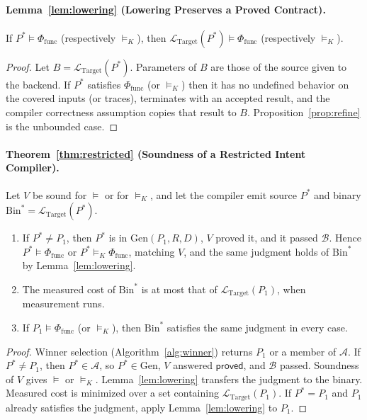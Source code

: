 \paragraph{Lemma~\ref{lem:lowering} (Lowering Preserves a Proved Contract).}
If \(P^* \models \Phi_{\text{func}}\) (respectively \(\models_K\)), then
\(\mathcal{L}_{\text{Target}}(P^*) \models \Phi_{\text{func}}\)
(respectively \(\models_K\)).
\begin{proof}
Let \(B = \mathcal{L}_{\text{Target}}(P^*)\). Parameters of \(B\) are those
of the source given to the backend. If \(P^*\) satisfies \(\Phi_{\text{func}}\)
(or \(\models_K\)) then it has no undefined behavior on the covered inputs
(or traces), terminates with an accepted result, and the compiler
correctness assumption copies that result to \(B\).
Proposition~\ref{prop:refine} is the unbounded case.
\end{proof}

\paragraph{Theorem~\ref{thm:restricted} (Soundness of a Restricted Intent Compiler).}
Let \(V\) be sound for \(\models\) or for \(\models_K\), and let the compiler
emit source \(P^*\) and binary
\(\mathrm{Bin}^* = \mathcal{L}_{\text{Target}}(P^*)\).
\begin{enumerate}
  \item If \(P^* \neq P_1\), then \(P^*\) is in \(\mathrm{Gen}(P_1, R, D)\),
  \(V\) proved it, and it passed \(\mathcal{B}\). Hence
  \(P^* \models \Phi_{\text{func}}\) or \(P^* \models_K \Phi_{\text{func}}\),
  matching \(V\), and the same judgment holds of \(\mathrm{Bin}^*\) by
  Lemma~\ref{lem:lowering}.
  \item The measured cost of \(\mathrm{Bin}^*\) is at most that of
  \(\mathcal{L}_{\text{Target}}(P_1)\), when measurement runs.
  \item If \(P_1 \models \Phi_{\text{func}}\) (or \(\models_K\)), then
  \(\mathrm{Bin}^*\) satisfies the same judgment in every case.
\end{enumerate}
\begin{proof}
Winner selection (Algorithm~\ref{alg:winner}) returns \(P_1\) or a member of \(\mathcal{A}\). If
\(P^* \neq P_1\), then \(P^* \in \mathcal{A}\), so \(P^* \in \mathrm{Gen}\),
\(V\) answered \(\mathsf{proved}\), and \(\mathcal{B}\) passed.
Soundness of \(V\) gives \(\models\) or \(\models_K\).
Lemma~\ref{lem:lowering} transfers the judgment to the binary. Measured
cost is minimized over a set containing
\(\mathcal{L}_{\text{Target}}(P_1)\). If \(P^* = P_1\) and \(P_1\) already
satisfies the judgment, apply Lemma~\ref{lem:lowering} to \(P_1\).
\end{proof}

